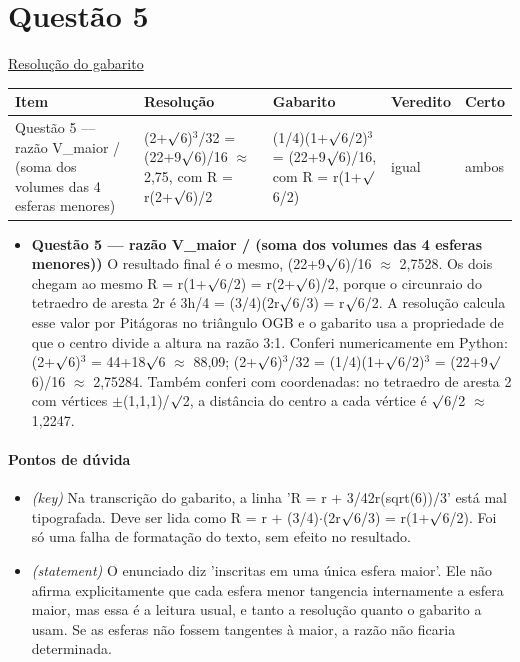 \documentclass{article}%
\begin{document}
\section*{Questão 5}%
\href{https://poliedroresolve.sistemapoliedro.com.br/vestibulares/ita/2026/ita-2-fase-dia-1-28-10-2025-2-fase-dia-1/dissertativa-5-matematica-2-fase-dia-1-ita-2026}{Resolução do gabarito}\par\smallskip%
\begin{longtable}{@{}p{} p{} p{} p{} p{}@{}}\toprule Item & Resolução & Gabarito & Veredito & Certo \\ \midrule
Questão 5 --- razão V\_maior / (soma dos volumes das 4 esferas menores) & (2+$\surd$6)$^3$/32 = (22+9$\surd$6)/16 $\approx$ 2,75, com R = r(2+$\surd$6)/2 & (1/4)(1+$\surd$6/2)$^3$ = (22+9$\surd$6)/16, com R = r(1+$\surd$6/2) & igual & ambos \\
\bottomrule\end{longtable}%
\begin{itemize}%
\item%
\textbf{Questão 5 --- razão V\_maior / (soma dos volumes das 4 esferas menores))} O resultado final é o mesmo, (22+9$\surd$6)/16 $\approx$ 2,7528. Os dois chegam ao mesmo R = r(1+$\surd$6/2) = r(2+$\surd$6)/2, porque o circunraio do tetraedro de aresta 2r é 3h/4 = (3/4)(2r$\surd$6/3) = r$\surd$6/2. A resolução calcula esse valor por Pitágoras no triângulo OGB e o gabarito usa a propriedade de que o centro divide a altura na razão 3:1. Conferi numericamente em Python: (2+$\surd$6)$^3$ = 44+18$\surd$6 $\approx$ 88,09; (2+$\surd$6)$^3$/32 = (1/4)(1+$\surd$6/2)$^3$ = (22+9$\surd$6)/16 $\approx$ 2,75284. Também conferi com coordenadas: no tetraedro de aresta 2 com vértices $\pm$(1,1,1)/$\surd$2, a distância do centro a cada vértice é $\surd$6/2 $\approx$ 1,2247.%
\end{itemize}%
\paragraph{Pontos de dúvida}%
\begin{itemize}%
\item%
\textit{(key)} Na transcrição do gabarito, a linha 'R = r + 3/42r(sqrt(6))/3' está mal tipografada. Deve ser lida como R = r + (3/4)$\cdot$(2r$\surd$6/3) = r(1+$\surd$6/2). Foi só uma falha de formatação do texto, sem efeito no resultado.%
\item%
\textit{(statement)} O enunciado diz 'inscritas em uma única esfera maior'. Ele não afirma explicitamente que cada esfera menor tangencia internamente a esfera maior, mas essa é a leitura usual, e tanto a resolução quanto o gabarito a usam. Se as esferas não fossem tangentes à maior, a razão não ficaria determinada.%
\end{itemize}%
\end{document}

